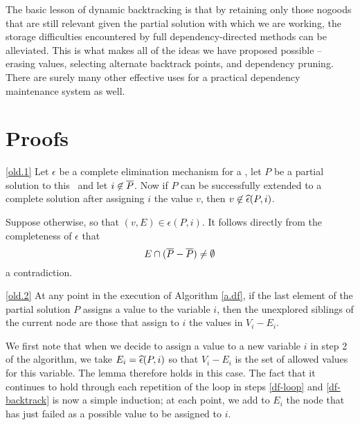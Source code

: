 The basic lesson of dynamic backtracking is that by retaining only
those nogoods that are still relevant given the partial solution with
which we are working, the storage difficulties encountered by full
dependency-directed methods can be alleviated.  This is what makes all
of the ideas we have proposed possible -- erasing values, selecting
alternate backtrack points, and dependency pruning.  There are surely
many other effective uses for a practical dependency maintenance
system as well.


\appendix

\section{Proofs}

\begin{oldlemma}{\ref{old.1}} Let $\epsilon$ be a complete elimination
mechanism for a \csp, let $P$ be a partial solution to this \csp\ and
let $i\not\in \overline P$.  Now if $P$ can be successfully extended to a
complete solution after assigning $i$ the value $v$, then
$v\not\in\widehat\epsilon(P,i)$.
 \end{oldlemma}

\proof Suppose otherwise, so that $(v,E)\in\epsilon(P,i)$.  It follows
directly from the completeness of $\epsilon$ that
 \[E\cap(\overline P - \overline P) \neq\emptyset\]
 a contradiction.\proofend

\begin{oldlemma}{\ref{old.2}} At any point in the execution of
Algorithm \ref{a.df}, if the last element of the partial solution $P$
assigns a value to the variable $i$, then the unexplored siblings of
the current node are those that assign to $i$ the values in $V_i-E_i$.
 \end{oldlemma}

\proof We first note that when we decide to assign a value to a new
variable $i$ in step 2 of the algorithm, we take $E_i=\widehat\epsilon(P,i)$ so
that $V_i-E_i$ is the set of allowed values for this variable.  The
lemma therefore holds in this case.  The fact that it continues to
hold through each repetition of the loop in steps \ref{df-loop} and
\ref{df-backtrack} is now a simple induction; at each point, we add to
$E_i$ the node that has just failed as a possible value to be assigned
to $i$.\proofend

